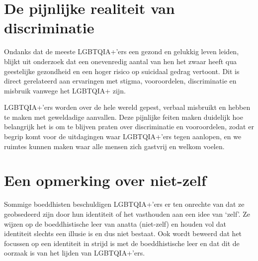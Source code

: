 \documentclass[12pt,openany]{book}
\begin{document}
\section*{De pijnlijke realiteit van discriminatie}

Ondanks dat de meeste LGBTQIA+’ers een gezond en gelukkig leven leiden, blijkt uit onderzoek dat een onevenredig aantal van hen het zwaar heeft qua geestelijke gezondheid en een hoger risico op suicidaal gedrag vertoont. Dit is direct gerelateerd aan ervaringen met stigma, vooroordelen, discriminatie en misbruik vanwege het LGBTQIA+ zijn. 

\medskip

\noindent{}

LGBTQIA+’ers worden over de hele wereld gepest, verbaal misbruikt en hebben te maken met geweldadige aanvallen. Deze pijnlijke feiten maken duidelijk hoe belangrijk het is om te blijven praten over discriminatie en vooroordelen, zodat er begrip komt voor de uitdagingen waar LGBTQIA+’ers tegen aanlopen, en we ruimtes kunnen maken waar alle mensen zich gastvrij en welkom voelen.

\section*{Een opmerking over niet-zelf}

Sommige boeddhisten beschuldigen LGBTQIA+’ers er ten onrechte van dat ze geobsedeerd zijn door hun identiteit of het vasthouden aan een idee van ‘zelf’. Ze wijzen op de boeddhistische leer van anatta (niet-zelf) en houden vol dat identiteit slechts een illusie is en dus niet bestaat. Ook wordt beweerd dat het focussen op een identiteit in strijd is met de boeddhistische leer en dat dit de oorzaak is van het lijden van LGBTQIA+’ers. 
\end{document}
